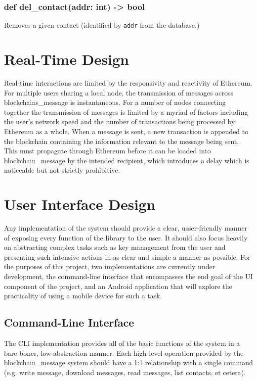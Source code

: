 \documentclass[titlepage]{report}
\begin{document}
\subsubsection{def del\_contact(addr: int) -> bool}
Removes a given contact (identified by \texttt{addr} from the database.)

\section{Real-Time Design}
Real-time interactions are limited by the responsivity and reactivity of \gls{Ethereum}. For multiple users sharing a local node, the transmission of messages across blockchains\_message is instantaneous. For a number of nodes connecting together the transmission of messages is limited by a myriad of factors including the user's network speed and the number of transactions being processed by \gls{Ethereum} as a whole. When a message is sent, a new transaction is appended to the \gls{blockchain} containing the information relevant to the message being sent. This must propagate through \gls{Ethereum} before it can be loaded into blockchain\_message by the intended recipient, which introduces a delay which is noticeable but not strictly prohibitive.

\section{User Interface Design}
Any implementation of the system should provide a clear, usser-friendly manner of exposing every function of the library to the user. It should also focus heavily on abstracting complex tasks such as key management from the user and presenting such intensive actions in as clear and simple a manner as possible. For the purposes of this project, two implementations are currently under development, the command-line interface that encompasses the end goal of the UI component of the project, and an Android application that will explore the practicality of using a mobile device for such a task.

\subsection{Command-Line Interface}
The CLI implementation provides all of the basic functions of the system in a bare-bones, low abstraction manner. Each high-level operation provided by the blockchain\_message system should have a 1:1 relationship with a single command (e.g. write message, download messages, read messages, list contacts, et cetera).
\end{document}
